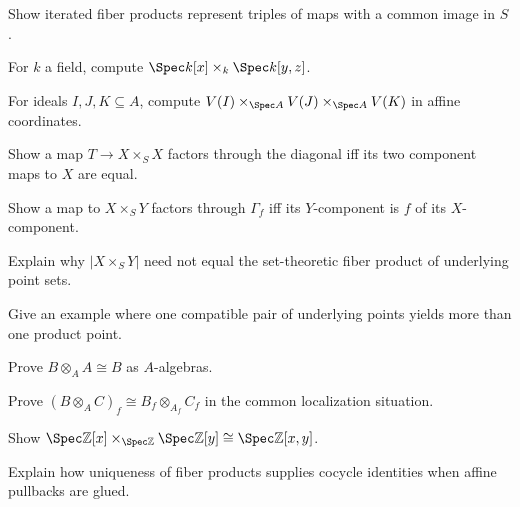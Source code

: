\begin{exercise}\label{exr:vi23-13}
Show iterated fiber products represent triples of maps with a common image in $S$.
\end{exercise}

\begin{exercise}\label{exr:vi23-14}
For $k$ a field, compute $\Spec k[x]\times_k\Spec k[y,z]$.
\end{exercise}

\begin{exercise}\label{exr:vi23-15}
For ideals $I,J,K\subseteq A$, compute $V(I)\times_{\Spec A}V(J)\times_{\Spec A}V(K)$ in affine coordinates.
\end{exercise}

\begin{exercise}\label{exr:vi23-16}
Show a map $T\to X\times_SX$ factors through the diagonal iff its two component maps to $X$ are equal.
\end{exercise}

\begin{exercise}\label{exr:vi23-17}
Show a map to $X\times_SY$ factors through $\Gamma_f$ iff its $Y$-component is $f$ of its $X$-component.
\end{exercise}

\begin{exercise}\label{exr:vi23-18}
Explain why $|X\times_SY|$ need not equal the set-theoretic fiber product of underlying point sets.
\end{exercise}

\begin{exercise}\label{exr:vi23-19}
Give an example where one compatible pair of underlying points yields more than one product point.
\end{exercise}

\begin{exercise}\label{exr:vi23-20}
Prove $B\otimes_AA\cong B$ as $A$-algebras.
\end{exercise}

\begin{exercise}\label{exr:vi23-21}
Prove $(B\otimes_AC)_f\cong B_f\otimes_{A_f}C_f$ in the common localization situation.
\end{exercise}

\begin{exercise}\label{exr:vi23-22}
Show $\Spec\mathbb Z[x]\times_{\Spec\mathbb Z}\Spec\mathbb Z[y]\cong\Spec\mathbb Z[x,y]$.
\end{exercise}

\begin{exercise}\label{exr:vi23-23}
Explain how uniqueness of fiber products supplies cocycle identities when affine pullbacks are glued.
\end{exercise}

